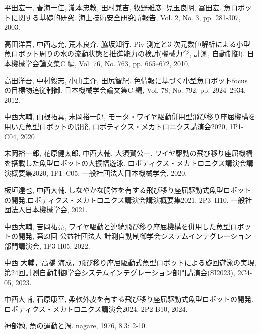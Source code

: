 
\newpage
\begin{thebibliography}{9}
    平田宏一, 春海一佳, 瀧本忠教, 田村兼吉, 牧野雅彦, 児玉良明, 冨田宏. 魚ロボットに関する基礎的研究. 海上技術安全研究所報告, Vol. 2, No. 3, pp. 281-307, 2003.
 
    高田洋吾, 中西志允, 荒木良介, 脇坂知行. Piv 測定と3 次元数値解析による小型魚ロボット周りの水の流動状態と推進能力の検討(機械力学, 計測, 自動制御). 日本機械学会論文集C 編, Vol. 76, No. 763, pp. 665–672, 2010.

    高田洋吾, 中村毅志, 小山圭介, 田尻智紀. 色情報に基づく小型魚ロボットfocus の目標物追従制御. 日本機械学会論文集C 編, Vol. 78, No. 792, pp. 2924–2934, 2012.

    中西大輔, 山根拓真, 末岡裕一郎, モータ・ワイヤ駆動併用型飛び移り座屈機構を用いた魚型ロボットの開発, ロボティクス・メカトロニクス講演会2020, 1P1-C04, 2020

    末岡裕一郎, 花原健太郎, 中西大輔, 大須賀公一. ワイヤ駆動の飛び移り座屈機構を搭載した魚型ロボットの大振幅遊泳. ロボティクス・メカトロニクス講演会講演概要集2020, 1P1–C05. 一般社団法人日本機械学会, 2020.

    板垣達也, 中西大輔. しなやかな胴体を有する飛び移り座屈駆動式魚型ロボットの開発.ロボティクス・メカトロニクス講演会講演概要集2021, 2P3–H10. 一般社団法人日本機械学会, 2021.

    中西大輔, 吉岡祐亮, ワイヤ駆動と連続飛び移り座屈機構を併用した魚型ロボットの開発, 第23回 公益社団法人 計測自動制御学会システムインテグレーション部門講演会, 1P3-H05, 2022.

    中西 大輔，高橋 海成，飛び移り座屈駆動式魚型ロボットによる旋回遊泳の実現, 第24回計測自動制御学会システムインテグレーション部門講演会(SI2023), 2C4-05, 2023.

    中西大輔, 石原康平, 柔軟外皮を有する飛び移り座屈駆動式魚型ロボットの開発. ロボティクス・メカトロニクス講演会2024, 2P2-B10, 2024.

    神部勉, 魚の運動と渦. nagare, 1976, 8.3: 2-10.

\end{thebibliography}


